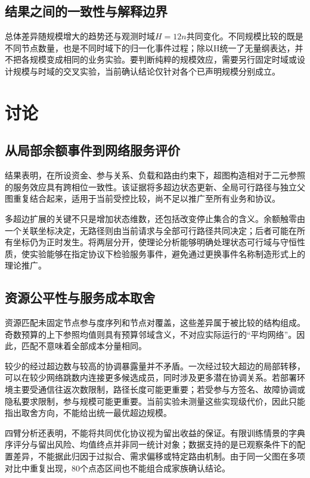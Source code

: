 \documentclass[UTF8,a4paper,twocolumn,fontset=none,zihao=5]{ctexart}
\begin{document}
\subsection{结果之间的一致性与解释边界}

总体差异随规模增大的趋势还与观测时域$H=12n$共同变化。不同规模比较的既是不同节点数量，也是不同时域下的归一化事件过程；除以H统一了无量纲表达，并不把各规模变成相同的业务实验。要判断纯粹的规模效应，需要另行固定时域或设计规模与时域的交叉实验，当前确认结论仅针对各个已声明规模分别成立。


\section{讨论}

\subsection{从局部余额事件到网络服务评价}

结果表明，在所设资金、参与关系、负载和路由约束下，超图构造相对于二元参照的服务效应具有跨相位一致性。该证据将多超边状态更新、全局可行路径与独立父图重复结合起来，适用于当前受控比较，尚不足以推广至所有业务和协议。


多超边扩展的关键不只是增加状态维数，还包括改变停止集合的含义。余额触零由一个关联坐标决定，无路径则由当前请求与全部可行路径共同决定；后者可能在所有坐标仍为正时发生。将两层分开，使理论分析能够明确处理状态可行域与守恒性质，使实验能够在指定协议下检验服务事件，避免通过更换事件名称制造形式上的理论推广。


\subsection{资源公平性与服务成本取舍}

资源匹配未固定节点参与度序列和节点对覆盖，这些差异属于被比较的结构组成。奇数预算的上下参照均值则具有预算邻域含义，不对应实际运行的“平均网络”。因此，匹配不意味着全部成本分量相同。


较少的经过超边数与较高的协调暴露量并不矛盾。一次经过较大超边的局部转移，可以在较少网络跳数内连接更多候选成员，同时涉及更多潜在协调关系。若部署环境主要受通信往返次数限制，路径长度可能更重要；若受参与方签名、故障协调或隐私要求限制，参与规模可能更重要。当前实验未测量这些实现级代价，因此只能指出取舍方向，不能给出统一最优超边规模。


四臂分析还表明，不能将共同优化协议视为留出收益的保证。有限训练情景的字典序评分与留出风险、均值终点并非同一统计对象；数据支持的是已观察条件下的配置差异，不能据此归因于过拟合、需求偏移或特定路由机制。由于同一父图在多项对比中重复出现，80个点态区间也不能组合成家族确认结论。
\end{document}
